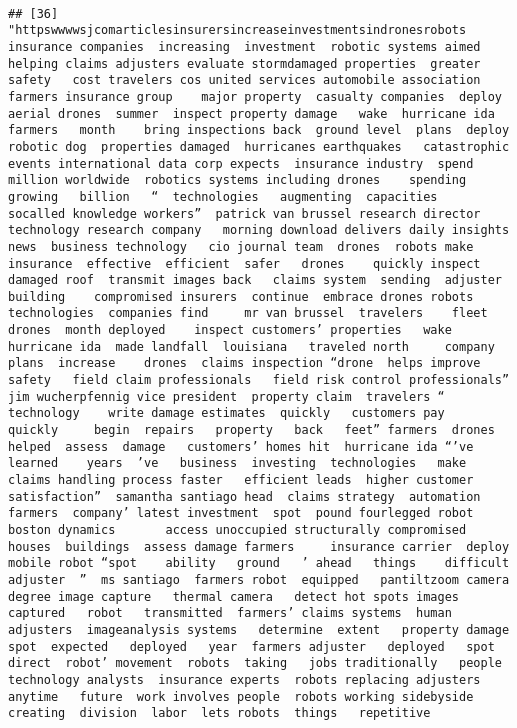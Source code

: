 \documentclass[
]{article}
\begin{document}
\begin{verbatim}
                                                                                                                                                                                                                                                                                                                                                                                                                                                                   
## [36] "httpswwwwsjcomarticlesinsurersincreaseinvestmentsindronesrobots insurance companies  increasing  investment  robotic systems aimed  helping claims adjusters evaluate stormdamaged properties  greater safety   cost travelers cos united services automobile association  farmers insurance group    major property  casualty companies  deploy aerial drones  summer  inspect property damage   wake  hurricane ida  farmers   month    bring inspections back  ground level  plans  deploy  robotic dog  properties damaged  hurricanes earthquakes   catastrophic events international data corp expects  insurance industry  spend   million worldwide  robotics systems including drones    spending growing   billion   “  technologies   augmenting  capacities   socalled knowledge workers”  patrick van brussel research director   technology research company   morning download delivers daily insights  news  business technology   cio journal team  drones  robots make insurance  effective  efficient  safer   drones    quickly inspect  damaged roof  transmit images back   claims system  sending  adjuster   building    compromised insurers  continue  embrace drones robots   technologies  companies find     mr van brussel  travelers    fleet     drones  month deployed    inspect customers’ properties   wake  hurricane ida  made landfall  louisiana   traveled north     company   plans  increase    drones  claims inspection “drone  helps improve  safety   field claim professionals   field risk control professionals”  jim wucherpfennig vice president  property claim  travelers “ technology    write damage estimates  quickly   customers pay   quickly     begin  repairs   property   back   feet” farmers  drones  helped  assess  damage   customers’ homes hit  hurricane ida “’ve learned    years  ’ve   business  investing  technologies   make  claims handling process faster   efficient leads  higher customer satisfaction”  samantha santiago head  claims strategy  automation  farmers  company’ latest investment  spot  pound fourlegged robot  boston dynamics       access unoccupied structurally compromised houses  buildings  assess damage farmers     insurance carrier  deploy  mobile robot “spot    ability   ground   ’ ahead   things    difficult   adjuster  ”  ms santiago  farmers robot  equipped   pantiltzoom camera     degree image capture   thermal camera   detect hot spots images captured   robot   transmitted  farmers’ claims systems  human adjusters  imageanalysis systems   determine  extent   property damage spot  expected   deployed   year  farmers adjuster   deployed   spot   direct  robot’ movement  robots  taking   jobs traditionally   people  technology analysts  insurance experts  robots replacing adjusters anytime   future  work involves people  robots working sidebyside  creating  division  labor  lets robots  things   repetitive 
\end{verbatim}
\end{document}
